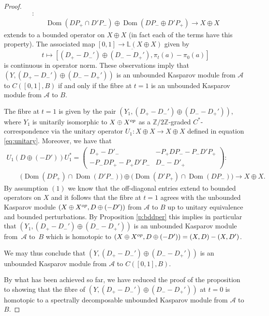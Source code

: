 \documentclass[11pt]{article}
\numberwithin{equation}{section}
\newcommand{\op}{\oplus}
\newcommand{\zz}{\mathbb{Z}}
\newcommand{\ov}{\overline}
\newcommand{\s}[1]{\mathscr{#1}}
\newcommand{\B}[1]{\mathbb{#1}}
\begin{document}
\begin{proof}
\begin{gather*}
 [ (D_+ - D_-') \op (D_- - D_+') , \pi_t(a) - \pi_0(a) ]
 \colon \\
 \qquad{} \operatorname{Dom}(DP_+ \cap D'P_-) \op \operatorname{Dom}(D P_- \op D'P_+) \to X \op X
\end{gather*}
extends to a bounded operator on $X \op X$ (in fact each of the terms have this property). The associated map $[0,1] \to \B L(X \op X)$ given by
\[
t \mapsto \ov{ [ (D_+ - D_-') \op (D_- - D_+') , \pi_t(a) - \pi_0(a) ] }
\]
is continuous in operator norm. These observations imply that $(Y, (D_+ - D_-') \op (D_- - D_+'))$ is an unbounded Kasparov module from $\s A$ to $C( [0,1],B)$ if and only if the fibre at $t = 1$ is an unbounded Kasparov module from $\s A$ to $B$.

The fibre at $t = 1$ is given by the pair $( Y_1, (D_+ - D_-') \op (D_- - D_+') )$, where $Y_1$ is unitarily isomorphic to $X \op X^{{\rm op}}$ as a $\zz/2\zz$-graded $C^*$-correspondence via the unitary operator $U_1\colon X \op X \to X \op X$ defined in equation~ \eqref{eq:unitary}. Moreover, we have that
\begin{gather*}
 U_1 ( D \op (- D') ) U_1^*
= \left(\begin{matrix} D_+ - D'_- & - P_+ D P_- - P_- D' P_+ \\ - P_- D P_+ - P_+ D' P_- & D_- - D'_+\end{matrix}\right)\colon \nonumber\\
\qquad{} \big( \operatorname{Dom}( DP_+) \cap \operatorname{Dom}( D' P_-) \big) \op \big( \operatorname{Dom}( D'P_+) \cap \operatorname{Dom}( D P_-) \big)%
\to X \op X .
\end{gather*}
By assumption $(1)$ we know that the off-diagonal entries extend to bounded operators on $X$ and it follows that the fibre at $t = 1$ agrees with the unbounded Kasparov module $(X \op X^{{\rm op}}, D \op (- D') )$ from $\s A$ to $B$ up to unitary equivalence and bounded perturbations. By Proposition \ref{p:bddper} this implies in particular that $(Y_1, (D_+ - D_-') \op (D_- - D_+'))$ is an unbounded Kasparov module from~$\s A$ to~$B$ which is homotopic to $(X \op X^{{\rm op}}, D \op (- D')) = (X,D) - (X, D')$.

We may thus conclude that $(Y,(D_+ - D_-') \op (D_- - D_+'))$ is an unbounded Kasparov module from $\s A$ to $C( [0,1],B)$.

By what has been achieved so far, we have reduced the proof of the proposition to showing that the fibre of $(Y, (D_+ - D_-') \op (D_- - D_+'))$ at $t = 0$ is homotopic to a spectrally decomposable unbounded Kasparov module from $\s A$ to $B$.


\end{proof}
\end{document}
